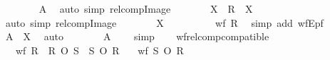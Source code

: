 \begin{isabellebody}
\ \ \ \ \ \ \isamarkupfalse%
\ A\ \isamarkupfalse%
\ {\isacharparenleft}{\kern0pt}auto\ simp{\isacharcolon}{\kern0pt}\ relcomp{\isacharunderscore}{\kern0pt}Image{\isacharparenright}{\kern0pt}\isanewline
\ \ \ \ \isamarkupfalse%
\ \isamarkupfalse%
\ {\isachardoublequoteopen}{\isacharquery}{\kern0pt}X\ {\isasymsubseteq}\ R\ {\isacharbackquote}{\kern0pt}{\isacharbackquote}{\kern0pt}\ {\isacharquery}{\kern0pt}X{\isachardoublequoteclose}\isanewline
\ \ \ \ \ \ \isamarkupfalse%
\ {\isacharparenleft}{\kern0pt}auto\ simp{\isacharcolon}{\kern0pt}\ relcomp{\isacharunderscore}{\kern0pt}Image{\isacharparenright}{\kern0pt}\isanewline
\ \ \ \ \isamarkupfalse%
\ \isamarkupfalse%
\ {\isachardoublequoteopen}{\isacharquery}{\kern0pt}X\ {\isacharequal}{\kern0pt}\ {\isacharbraceleft}{\kern0pt}{\isacharbraceright}{\kern0pt}{\isachardoublequoteclose}\isanewline
\ \ \ \ \ \ \isamarkupfalse%
\ {\isacartoucheopen}wf\ R{\isacartoucheclose}\ \isamarkupfalse%
\ {\isacharparenleft}{\kern0pt}simp\ add{\isacharcolon}{\kern0pt}\ wfE{\isacharunderscore}{\kern0pt}pf{\isacharparenright}{\kern0pt}\isanewline
\ \ \ \ \isamarkupfalse%
\ \isamarkupfalse%
\ {\isachardoublequoteopen}A\ {\isasymsubseteq}\ {\isacharquery}{\kern0pt}X{\isachardoublequoteclose}\ \isamarkupfalse%
\ auto\isanewline
\ \ \ \ \isamarkupfalse%
\ \isamarkupfalse%
\ {\isachardoublequoteopen}A\ {\isacharequal}{\kern0pt}\ {\isacharbraceleft}{\kern0pt}{\isacharbraceright}{\kern0pt}{\isachardoublequoteclose}\ \isamarkupfalse%
\ simp\isanewline
\ \ \isamarkupfalse%
\isanewline
{}\isamarkupfalse%
%
\endisatagproof
{\isafoldproof}%
%
\isadelimproof
\isanewline
%
\endisadelimproof
\isanewline
{}\isamarkupfalse%
\ wf{\isacharunderscore}{\kern0pt}relcomp{\isacharunderscore}{\kern0pt}compatible{\isacharcolon}{\kern0pt}\isanewline
\ \ \ {\isachardoublequoteopen}wf\ R{\isachardoublequoteclose}\ \ {\isachardoublequoteopen}R\ O\ S\ {\isasymsubseteq}\ S\ O\ R{\isachardoublequoteclose}\isanewline
\ \ \ {\isachardoublequoteopen}wf\ {\isacharparenleft}{\kern0pt}S\ O\ R{\isacharparenright}{\kern0pt}{\isachardoublequoteclose}\isanewline
%
\isadelimproof
%
\endisadelimproof
%
\isatagproof
{}\isamarkupfalse%
\ {\isacharminus}{\kern0pt}\isanewline
\ \ \isamarkupfalse%

\end{isabellebody}

